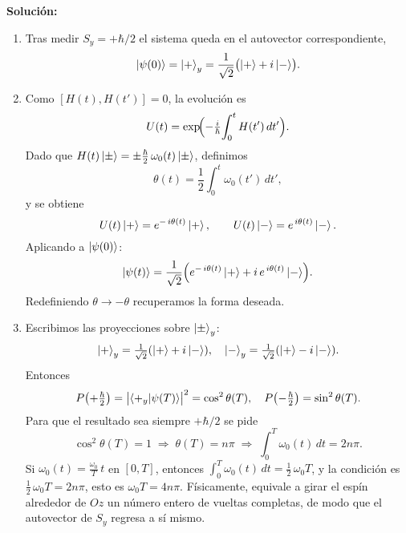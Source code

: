 \documentclass[a4paper,11pt]{article}
\begin{document}
\textbf{Solución:}
\begin{enumerate}
  \item Tras medir $S_y=+\hbar/2$ el sistema queda en el autovector correspondiente,
    \[
      \ket{\psi(0)} = \ket{+}_y
      = \frac{1}{\sqrt{2}}\bigl(\ket{+} + i\ket{-}\bigr).
    \]
  \item Como $[H(t),H(t')]=0$, la evolución es
    \[
      U(t)
      = \exp\!\Bigl(-\tfrac{i}{\hbar}\!\int_0^tH(t')\,dt'\Bigr).
    \]
    Dado que 
    $H(t)\ket{\pm}=\pm\frac{\hbar}{2}\,\omega_0(t)\ket{\pm}$, definimos
    \[
      \theta(t)=\frac{1}{2}\int_0^t\omega_0(t')\,dt',
    \]
    y se obtiene
    \[
      U(t)\ket{+}=e^{-\,i\theta(t)}\ket{+},\qquad
      U(t)\ket{-}=e^{\,i\theta(t)}\ket{-}.
    \]
    Aplicando a $\ket{\psi(0)}$:
    \[
      \ket{\psi(t)}
      =\frac{1}{\sqrt{2}}\Bigl(e^{-\,i\theta(t)}\ket{+}
        +i\,e^{\,i\theta(t)}\ket{-}\Bigr).
    \]
    Redefiniendo $\theta\to-\theta$ recuperamos la forma deseada.
  \item Escribimos las proyecciones sobre $\ket{\pm}_y$:
    \[
      \ket{+}_y=\tfrac1{\sqrt2}(\ket{+}+i\ket{-}),\quad
      \ket{-}_y=\tfrac1{\sqrt2}(\ket{+}-i\ket{-}).
    \]
    Entonces
    \[
      P\bigl(+\tfrac{\hbar}{2}\bigr)
      =\bigl|\braket{+_y|\psi(T)}\bigr|^2
      =\cos^2\theta(T),
      \quad
      P\bigl(-\tfrac{\hbar}{2}\bigr)=\sin^2\theta(T).
    \]
    Para que el resultado sea siempre $+\hbar/2$ se pide
    \[
      \cos^2\theta(T)=1
      \;\Longrightarrow\;
      \theta(T)=n\pi
      \;\Longrightarrow\;
      \int_0^T\omega_0(t)\,dt=2n\pi.
    \]
    Si $\omega_0(t)=\tfrac{\omega_0}{T}\,t$ en $[0,T]$, entonces
    $\int_0^T\omega_0(t)\,dt=\tfrac12\,\omega_0T$, y la condición es
    $\tfrac12\,\omega_0T=2n\pi$, esto es $\omega_0T=4n\pi$.  
    Físicamente, equivale a girar el espín alrededor de $Oz$ un número entero
    de vueltas completas, de modo que el autovector de $S_y$ regresa a sí mismo.
\end{enumerate}
\end{document}
